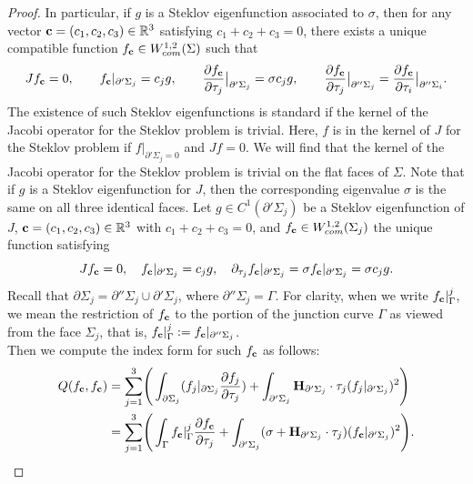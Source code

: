 \documentclass[11pt]{amsart}
\numberwithin{equation}{section}
\theoremstyle{theorem}
\theoremstyle{definition}
\numberwithin{equation}{section}
\begin{document}
\begin{proof}
In particular, if $g$ is a Steklov eigenfunction associated to $\sigma$, 
then for any vector $\bold{c}=(c_1,c_2,c_3)\in\mathbb{R}^3$ satisfying $c_1+c_2+c_3=0$, 
there exists a unique compatible function $f_{\bold{c}}\in W^{1,2}_{com}(\Sigma)$ such that
\[
J f_{\bold{c}} = 0, \qquad 
f_{\bold{c}}|_{\partial'\Sigma_j} = c_j g, \qquad
\frac{\partial f_{\bold{c}}}{\partial \tau_j}\big|_{\partial'\Sigma_j} = \sigma c_j g,
\qquad
\frac{\partial f_{\bold{c}}}{\partial \tau_j}\big|_{\partial''\Sigma_j}=\frac{\partial f_{\bold{c}}}{\partial \tau_i}\big|_{\partial''\Sigma_i}.
\]
The existence of such Steklov eigenfunctions is standard if the kernel of the Jacobi operator for the Steklov problem is trivial. Here, $f$ is in the kernel of $J$ for the Steklov problem if $f\vert_{\partial' \Sigma_j =0}$ and $Jf=0$. We will find that the kernel of the Jacobi operator for the Steklov problem is trivial on the flat faces of $\Sigma$. Note that if $g$ is a Steklov eigenfunction for $J$, then the corresponding eigenvalue $\sigma$ is the same on all three identical faces. Let $g\in C^1(\partial' \Sigma_j)$ be a Steklov eigenfunction of $J$, $\bold{c}=(c_1,c_2,c_3)\in \mathbb{R}^3$ with $c_1+c_2+c_3=0$, and $f_{\bold{c}}\in W^{1,2}_{com}(\Sigma_j)$ the unique function satisfying
\[
Jf_{\bold{c}}=0, \quad 
f_{\bold{c}}\vert_{\partial' \Sigma_j}=c_j g, \quad 
\partial_{\tau_j}f_{\bold{c}}\vert_{\partial' \Sigma_j} = \sigma f_{\bold{c}}\vert_{\partial' \Sigma_j} = \sigma c_j g.
\]
Recall that $\partial \Sigma_j = \partial'' \Sigma_j \cup \partial' \Sigma_j$, where $\partial'' \Sigma_j = \Gamma$. 
For clarity, when we write $f_{\bold{c}}\vert_{\Gamma}^j$, we mean the restriction of $f_{\bold{c}}$ to the portion of the junction curve $\Gamma$ as viewed from the face $\Sigma_j$, 
that is, $f_{\bold{c}}\vert_{\Gamma}^j := f_{\bold{c}}\vert_{\partial'' \Sigma_j}$.\\
Then we compute the index form for such $f_{\bold{c}}$ as follows:
\begin{equation}
\nonumber
\begin{split}
Q(f_{\bold{c}} , f_{\bold{c}}) 
 & = \underset{j=1}{\overset{3}{\sum}} 
 \Bigg( \int_{\partial \Sigma_j} (f_j\vert_{\partial \Sigma_j} \frac{\partial f_j}{\partial \tau_j})  
 + \int_{\partial' \Sigma_j  }    \bold{H}_{\partial' \Sigma_j} \cdot \tau_j (f_j \vert_{\partial' \Sigma_j} )^2 \Bigg) \\
 &= \underset{j=1}{\overset{3}{\sum}} 
 \Bigg( \int_{\Gamma } f_{\bold{c}}\vert_{\Gamma}^j 
\frac{\partial f_{\bold{c}}}{\partial\tau_j}
 + \int_{\partial' \Sigma_j  } (\sigma +\bold{H}_{\partial' \Sigma_j} \cdot \tau_j) (f_{\bold{c}} \vert_{\partial' \Sigma_j} )^2  \Bigg).

\end{split}
\end{equation}
\end{proof}
\end{document}
